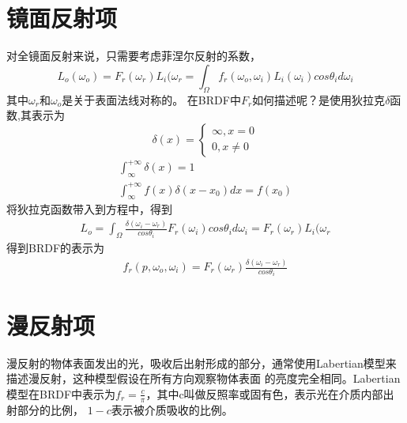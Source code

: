 \section{镜面反射项}
对全镜面反射来说，只需要考虑菲涅尔反射的系数，
$$
L_{o}({\omega}_{o})=F_{r}({\omega}_{r})L_{i}({\omega}_{r}=\int_{\Omega}f_{r}({\omega}_{o},{\omega}_{i})L_{i}({\omega}_{i})cos{\theta}_{i}d{\omega}_{i}
$$
其中${\omega}_{r}$和${\omega}_{o}$是关于表面法线对称的。
在BRDF中$F_{r}$如何描述呢？是使用狄拉克$\delta$函数,其表示为
\begin{equation}
    {\delta}(x)= \left\{ 
    \begin{aligned}        
        \infty, x = 0 \\
        0 , x \neq 0        
    \end{aligned}
    \right.
\end{equation}
\begin{equation}
    \begin{aligned}
        \int_{\infty}^{+\infty} {\delta}(x) = 1 \\ 
        \int_{\infty}^{+\infty}f(x){\delta}(x-x_{0})dx = f(x_{0})
    \end{aligned}    
\end{equation}
将狄拉克函数带入到方程中，得到
\begin{equation}
    \begin{aligned}
        L_{o}=\int_{\Omega}\frac{{\delta}({\omega}_{i}-{\omega}_{r})}{cos{\theta}_{i}}F_{r}({\omega}_{i})cos{\theta}_{i}d{\omega}_{i}=F_{r}({\omega}_{r})L_{i}({\omega}_{r}        
    \end{aligned}    
\end{equation}
得到BRDF的表示为
\begin{equation}
    \begin{aligned}
        f_{r}(p,{\omega}_{o},{\omega}_{i})=F_{r}({\omega}_{r})\frac{{\delta}({\omega}_{i}-{\omega}_{r})}{cos{\theta}_{i}}
    \end{aligned}
\end{equation}

\section{漫反射项}
漫反射的物体表面发出的光，吸收后出射形成的部分，通常使用Labertian模型来描述漫反射，这种模型假设在所有方向观察物体表面
的亮度完全相同。Labertian模型在BRDF中表示为$f_{r}=\frac{c}{\pi}$，其中c叫做反照率或固有色，表示光在介质内部出射部分的比例，
$1-c$表示被介质吸收的比例。

